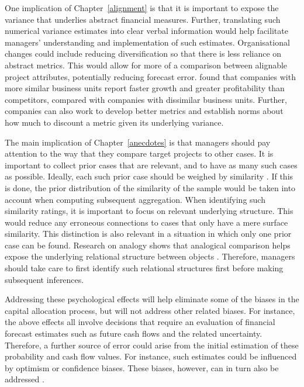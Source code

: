 \documentclass[a4paper, nobind]{templates/ociamthesis}
\theoremstyle{definition}
\theoremstyle{definition}
\theoremstyle{definition}
\theoremstyle{definition}
\theoremstyle{remark}
\begin{document}
One implication of Chapter~\ref{alignment} is that it is important to expose
the variance that underlies abstract financial measures. Further, translating
such numerical variance estimates into clear verbal information would help
facilitate managers' understanding and implementation of such estimates.
Organisational changes could include reducing diversification so that there is
less reliance on abstract metrics. This would allow for more of a comparison
between alignable project attributes, potentially reducing forecast error.
\textcite{koller2017} found that companies with more similar business units report faster
growth and greater profitability than competitors, compared with companies with
dissimilar business units. Further, companies can also work to develop better
metrics and establish norms about how much to discount a metric given its
underlying variance.

The main implication of Chapter~\ref{anecdotes} is that managers should pay
attention to the way that they compare target projects to other cases. It is
important to collect prior cases that are relevant, and to have as many such
cases as possible. Ideally, each such prior case should be weighed by similarity
\autocite{lovallo2012}. If this is done, the prior distribution of the similarity of the
sample would be taken into account when computing subsequent aggregation. When
identifying such similarity ratings, it is important to focus on relevant
underlying structure. This would reduce any erroneous connections to cases that
only have a mere surface similarity. This distinction is also relevant in a
situation in which only one prior case can be found. Research on analogy shows
that analogical comparison helps expose the underlying relational structure
between objects \autocites[e.g.,][]{kurtz2013,markman1993}. Therefore, managers should
take care to first identify such relational structures first before making
subsequent inferences.

Addressing these psychological effects will help eliminate some of the biases in
the capital allocation process, but will not address other related biases. For
instance, the above effects all involve decisions that require an evaluation of
financial forecast estimates such as future cash flows and the related
uncertainty. Therefore, a further source of error could arise from the initial
estimation of these probability and cash flow values. For instance, such
estimates could be influenced by optimism or confidence biases. These biases,
however, can in turn also be addressed \autocite{flyvbjerg2018}.
\end{document}
